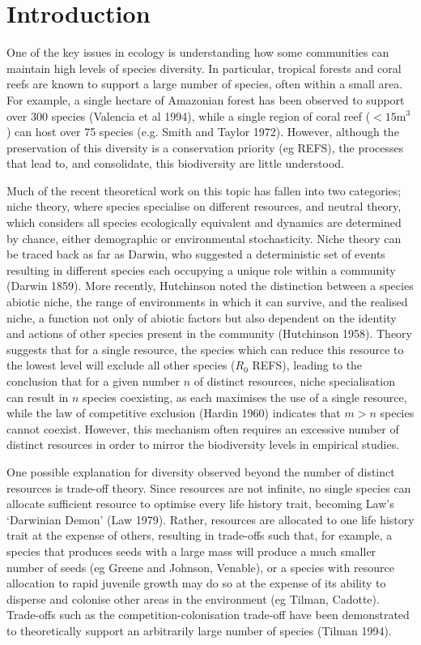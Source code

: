 

\section*{Introduction}
One of the key issues in ecology is understanding how some communities can maintain high levels of species diversity. In particular, tropical forests and coral reefs are known to support a large number of species, often within a small area. For example, a single hectare of Amazonian forest has been observed to support over 300 species (Valencia et al 1994), while a single region of coral reef ($<15$m$^3$) can host over 75 species (e.g. Smith and Taylor 1972). However, although the preservation of this diversity is a conservation priority (eg REFS), the processes that lead to, and consolidate, this biodiversity are little understood.

Much of the recent theoretical work on this topic has fallen into two categories; niche theory, where species specialise on different resources, and neutral theory, which considers all species ecologically equivalent and dynamics are determined by chance, either demographic or environmental stochasticity. Niche theory can be traced back as far as Darwin, who suggested a deterministic set of events resulting in different species each occupying a unique role within a community (Darwin 1859). More recently, Hutchinson noted the distinction between a species abiotic niche, the range of environments in which it can survive, and the realised niche, a function not only of abiotic factors but also dependent on the identity and actions of other species present in the community (Hutchinson 1958). Theory suggests that for a single resource, the species which can reduce this resource to the lowest level will exclude all other species ($R_0$ REFS), leading to the conclusion that for a given number $n$ of distinct resources, niche specialisation can result in $n$ species coexisting, as each maximises the use of a single resource, while the law of competitive exclusion (Hardin 1960) indicates that $m>n$ species cannot coexist. However, this mechanism often requires an excessive number of distinct resources in order to mirror the biodiversity levels in empirical studies.

 One possible explanation for diversity observed beyond the number of distinct resources is trade-off theory. Since resources are not infinite, no single species can allocate sufficient resource to optimise every life history trait, becoming Law's `Darwinian Demon' (Law 1979). Rather, resources are allocated to one life history trait  at the expense of others, resulting in trade-offs such that, for example, a species that produces seeds with a large mass will produce a much smaller number of seeds (eg Greene and Johnson, Venable), or a species with resource allocation to rapid juvenile growth may do so at the expense of its ability to disperse and colonise other areas in the environment (eg Tilman, Cadotte). Trade-offs such as the competition-colonisation trade-off have been demonstrated to theoretically support an arbitrarily large number of species (Tilman 1994).
 
